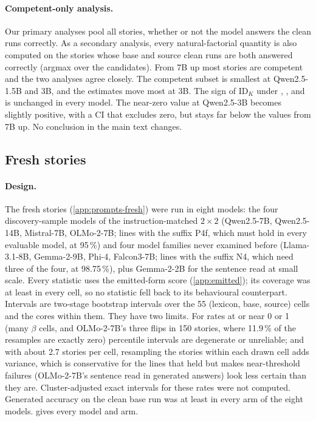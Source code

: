 \paragraph{Competent-only analysis.} Our primary analyses pool all stories, whether or not the model answers the clean runs correctly. As a secondary analysis, every natural-factorial quantity is also computed on the stories whose base and source clean runs are both answered correctly (argmax over the candidates). From 7B up most stories are competent and the two analyses agree closely. The competent subset is smallest at Qwen2.5-1.5B and 3B, and the estimates move most at 3B. The sign of $\mathrm{ID}_K$ under \fmtOpt{}, \fmtLetter{}, \fmtNone{} and \fmtBefore{} is unchanged in every model. The near-zero \fmtPost{} value at Qwen2.5-3B becomes slightly positive, with a CI that excludes zero, but stays far below the \fmtPost{} values from 7B up. No conclusion in the main text changes.

\subsection{Fresh stories}\label{app:fresh}

\paragraph{Design.} The fresh stories (\cref{app:prompts-fresh}) were run in eight models: the four discovery-sample models of the instruction-matched $2{\times}2$ (Qwen2.5-7B, Qwen2.5-14B, Mistral-7B, OLMo-2-7B; lines with the suffix P4f, which must hold in every evaluable model, at 95\,\%) and four model families never examined before (Llama-3.1-8B, Gemma-2-9B, Phi-4, Falcon3-7B; lines with the suffix N4, which need three of the four, at 98.75\,\%), plus Gemma-2-2B for the sentence read at small scale. Every statistic uses the emitted-form score (\cref{app:emitted}); its coverage was at least \JbGfourCovMin{} in every cell, so no statistic fell back to its behavioural counterpart. Intervals are two-stage bootstrap intervals over the 55 (lexicon, base, source) cells and the cores within them. They have two limits. For rates at or near 0 or 1 (many $\beta$ cells, and OLMo-2-7B's three flips in 150 stories, where 11.9\,\% of the resamples are exactly zero) percentile intervals are degenerate or unreliable; and with about 2.7 stories per cell, resampling the stories within each drawn cell adds variance, which is conservative for the lines that held but makes near-threshold failures (OLMo-2-7B's sentence read in generated answers) look less certain than they are. Cluster-adjusted exact intervals for these rates were not computed. Generated accuracy on the clean base run was at least \JbGfiveAccMin{} in every arm of the eight models.  gives every model and arm. %


